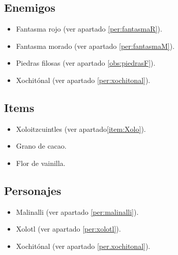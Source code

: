 	\subsection{Enemigos}
	\begin{itemize}
		\item Fantasma rojo (ver apartado \ref{per:fantasmaR}).
			
		\item Fantasma morado (ver apartado \ref{per:fantasmaM}).
			
		\item Piedras filosas (ver apartado \ref{obs:piedrasF}).
		\item Xochitónal (ver apartado \ref{per:xochitonal}).
			
	\end{itemize}
	\subsection{Items}
	\begin{itemize}
		\item Xoloitzcuintles (ver apartado\ref{item:Xolo}).
		\item Grano de cacao.
		\item Flor de vainilla.
	\end{itemize}
	\subsection{Personajes}
	\begin{itemize}
		\item Malinalli (ver apartado \ref{per:malinalli}).
		\item Xolotl (ver apartado \ref{per:xolotl}).
			
		\item Xochitónal (ver apartado \ref{per.xochitonal}).
	\end{itemize}
	
